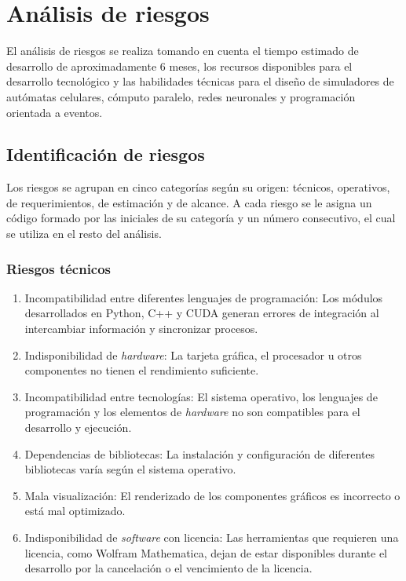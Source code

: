 \section{Análisis de riesgos}

El análisis de riesgos se realiza tomando en cuenta el tiempo estimado de desarrollo de aproximadamente 6 meses, los recursos disponibles para el desarrollo tecnológico y las habilidades técnicas para el diseño de simuladores de autómatas celulares, cómputo paralelo, redes neuronales y programación orientada a eventos. 

\subsection{Identificación de riesgos}

Los riesgos se agrupan en cinco categorías según su origen: técnicos, operativos, de requerimientos, de estimación y de alcance. A cada riesgo se le asigna un código formado por las iniciales de su categoría y un número consecutivo, el cual se utiliza en el resto del análisis.

\subsubsection{Riesgos técnicos}

\begin{enumerate}[label*=RT\arabic*, noitemsep]
	\item Incompatibilidad entre diferentes lenguajes de programación: Los módulos desarrollados en Python, C++ y CUDA generan errores de integración al intercambiar información y sincronizar procesos.
	
	\item Indisponibilidad de \textit{hardware}: La tarjeta gráfica, el procesador u otros componentes no tienen el rendimiento suficiente.
	
	\item Incompatibilidad entre tecnologías: El sistema operativo, los lenguajes de programación y los elementos de \textit{hardware} no son compatibles para el desarrollo y ejecución.
	
	\item Dependencias de bibliotecas: La instalación y configuración de diferentes bibliotecas varía según el sistema operativo.
	
	\item Mala visualización: El renderizado de los componentes gráficos es incorrecto o está mal optimizado.
	
	\item Indisponibilidad de \textit{software} con licencia: Las herramientas que requieren una licencia, como Wolfram Mathematica, dejan de estar disponibles durante el desarrollo por la cancelación o el vencimiento de la licencia.
\end{enumerate}

